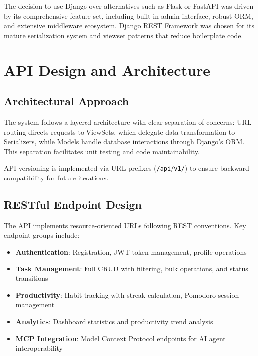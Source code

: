 \documentclass[11pt,a4paper]{article}
\begin{document}
The decision to use Django over alternatives such as Flask or FastAPI was driven by its comprehensive feature set, including built-in admin interface, robust ORM, and extensive middleware ecosystem. Django REST Framework was chosen for its mature serialization system and viewset patterns that reduce boilerplate code.

\section{API Design and Architecture}

\subsection{Architectural Approach}

The system follows a layered architecture with clear separation of concerns: URL routing directs requests to ViewSets, which delegate data transformation to Serializers, while Models handle database interactions through Django's ORM. This separation facilitates unit testing and code maintainability.

API versioning is implemented via URL prefixes (\texttt{/api/v1/}) to ensure backward compatibility for future iterations.

\subsection{RESTful Endpoint Design}

The API implements resource-oriented URLs following REST conventions. Key endpoint groups include:

\begin{itemize}[noitemsep]
    \item \textbf{Authentication}: Registration, JWT token management, profile operations
    \item \textbf{Task Management}: Full CRUD with filtering, bulk operations, and status transitions
    \item \textbf{Productivity}: Habit tracking with streak calculation, Pomodoro session management
    \item \textbf{Analytics}: Dashboard statistics and productivity trend analysis
    \item \textbf{MCP Integration}: Model Context Protocol endpoints for AI agent interoperability
\end{itemize}
\end{document}

